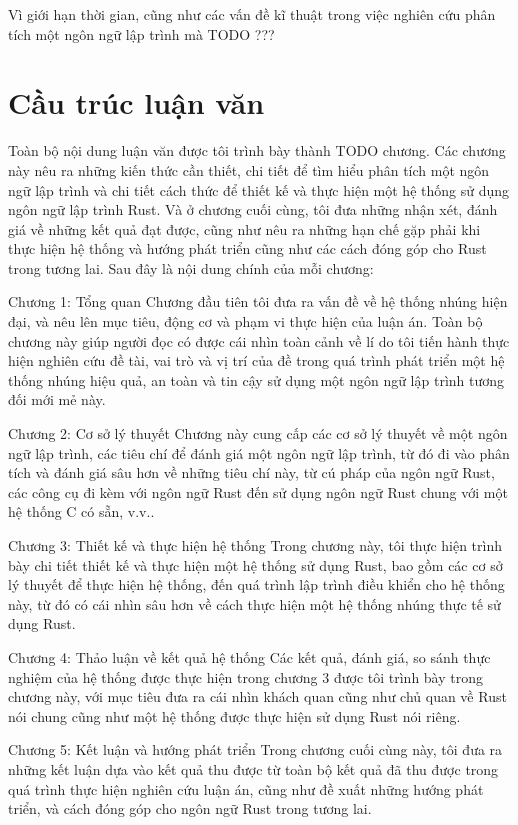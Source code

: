 Vì giới hạn thời gian, cũng như các vấn đề kĩ thuật trong việc nghiên cứu phân tích một ngôn ngữ lập trình mà TODO ???

\section{Cầu trúc luận văn}
Toàn bộ nội dung luận văn được tôi trình bày thành TODO chương. Các chương này nêu ra những kiến thức cần thiết, chi tiết để tìm hiểu phân tích một ngôn ngữ lập trình và chi tiết cách thức để thiết kế và thực hiện một hệ thống sử dụng ngôn ngữ lập trình Rust. Và ở chương cuối cùng, tôi đưa những nhận xét, đánh giá về những kết quả đạt được, cũng như nêu ra những hạn chế gặp phải khi thực hiện hệ thống và hướng phát triển cũng như các cách đóng góp cho Rust trong tương lai. Sau đây là nội dung chính của mỗi chương:

Chương 1: Tổng quan
Chương đầu tiên tôi đưa ra vấn đề về hệ thống nhúng hiện đại, và nêu lên mục tiêu, động cơ và phạm vi thực hiện của luận án. Toàn bộ chương này giúp người đọc có được cái nhìn toàn cảnh về lí do tôi tiến hành thực hiện nghiên cứu đề tài, vai trò và vị trí của đề trong quá trình phát triển một hệ thống nhúng hiệu quả, an toàn và tin cậy sử dụng một ngôn ngữ lập trình tương đối mới mẻ này.

Chương 2: Cơ sở lý thuyết
Chương này cung cấp các cơ sở lý thuyết về một ngôn ngữ lập trình, các tiêu chí để đánh giá một ngôn ngữ lập trình, từ đó đi vào phân tích và đánh giá sâu hơn về những tiêu chí này, từ cú pháp của ngôn ngữ Rust, các công cụ đi kèm với ngôn ngữ Rust đến sử dụng ngôn ngữ Rust chung với một hệ thống C có sẵn, v.v..

Chương 3: Thiết kế và thực hiện hệ thống
Trong chương này, tôi thực hiện trình bày chi tiết thiết kế và thực hiện một hệ thống sử dụng Rust, bao gồm các cơ sở lý thuyết để thực hiện hệ thống, đến quá trình lập trình điều khiển cho hệ thống này, từ đó có cái nhìn sâu hơn về cách thực hiện một hệ thống nhúng thực tế sử dụng Rust.

Chương 4: Thảo luận về kết quả hệ thống
Các kết quả, đánh giá, so sánh thực nghiệm của hệ thống được thực hiện trong chương 3 được tôi trình bày trong chương này, với mục tiêu đưa ra cái nhìn khách quan cũng như chủ quan về Rust nói chung cũng như một hệ thống được thực hiện sử dụng Rust nói riêng.

Chương 5: Kết luận và hướng phát triển
Trong chương cuối cùng này, tôi đưa ra những kết luận dựa vào kết quả thu được từ toàn bộ kết quả đã thu được trong quá trình thực hiện nghiên cứu luận án, cũng như đề xuất những hướng phát triển, và cách đóng góp cho ngôn ngữ Rust trong tương lai.
